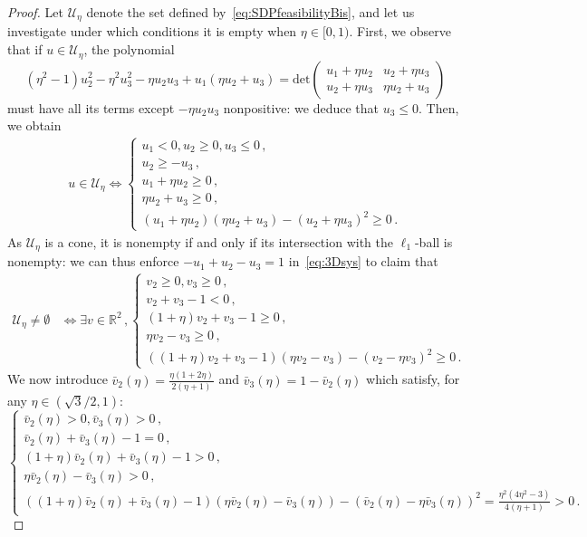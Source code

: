 \documentclass[a4paper,12pt]{article}
\newcommand{\RR}{\mathbb{R}}
\begin{document}
\begin{proof}
{Let $\mathcal{U}_\eta$ denote the set 
defined by~\eqref{eq:SDPfeasibilityBis},
and let us investigate under which conditions it is empty when $\eta \in [0, 1)$.
First, we observe that if $u \in \mathcal{U}_\eta$,
the polynomial
\begin{equation}
	(\eta^2-1)u_2^2 - \eta^2u_3^2 - \eta u_2u_3
	+ u_1(\eta u_2 + u_3)
	=
	\text{det}\begin{pmatrix}
	u_1 + \eta u_2 & u_2 + \eta u_3 \\
	u_2 + \eta u_3 & \eta u_2 + u_3
	\end{pmatrix}
\end{equation}
must have all its terms except $- \eta u_2u_3$
nonpositive: we deduce that $u_3 \leq 0$.
Then, we obtain
\begin{align}
	\label{eq:3Dsys}%
	u \in \mathcal{U}_\eta
	\iff
	\begin{cases}
	u_1 < 0, u_2 \geq 0, u_3 \leq 0 \,, \\
	u_2 \geq -u_3 \,, \\
	u_1 + \eta u_2 \geq 0 \,, \\
	\eta u_2 + u_3 \geq 0 \,, \\
	(u_1 + \eta u_2)(\eta u_2 + u_3) - (u_2 + \eta u_3)^2 \geq 0 \,.
	\end{cases}
\end{align}
As $\mathcal{U}_\eta$ is a cone,
it is nonempty if and only if
its intersection with the $\ell_1$-ball
is nonempty: we can thus enforce $-u_1 + u_2 - u_3 = 1$ in~\eqref{eq:3Dsys}
to claim that
\begin{align}
	\label{eq:2Dsys}%
	\mathcal{U}_\eta \neq \emptyset
	&\iff \exists v \in \RR^2 \,,
	\begin{cases}
		v_2 \geq 0, v_3 \geq 0 \,, \\
		v_2 + v_3 - 1 < 0 \,, \\
		(1+\eta)v_2 + v_3 - 1 \geq 0 \,, \\
		\eta v_2 - v_3 \geq 0 \,, \\
		((1+\eta)v_2 + v_3 - 1)(\eta v_2 - v_3)
		- (v_2 - \eta v_3)^2 \geq 0 \,.
	\end{cases} %
\end{align}
We now introduce
$\bar{v}_2(\eta) = \frac{\eta(1+2\eta)}{2(\eta+1)}$
and $\bar{v}_3(\eta) = 1 - \bar{v}_2(\eta)$
which satisfy, for any $\eta \in (\sqrt{3}/2, 1)$:
\begin{equation}
\begin{cases}
\bar{v}_2(\eta) > 0, \bar{v}_3(\eta) > 0 \,, \\
\bar{v}_2(\eta) + \bar{v}_3(\eta) - 1 = 0 \,, \\
(1+\eta)\bar{v}_2(\eta) + \bar{v}_3(\eta) - 1 > 0 \,, \\
\eta \bar{v}_2(\eta) - \bar{v}_3(\eta) > 0 \,, \\
((1+\eta)\bar{v}_2(\eta) + \bar{v}_3(\eta) - 1)(\eta \bar{v}_2(\eta) - \bar{v}_3(\eta))
- (\bar{v}_2(\eta) - \eta \bar{v}_3(\eta))^2 = \frac{\eta^2(4\eta^2-3)}{4(\eta + 1)} > 0 \,.
\end{cases} %
\end{equation}

}
\end{proof}
\end{document}
